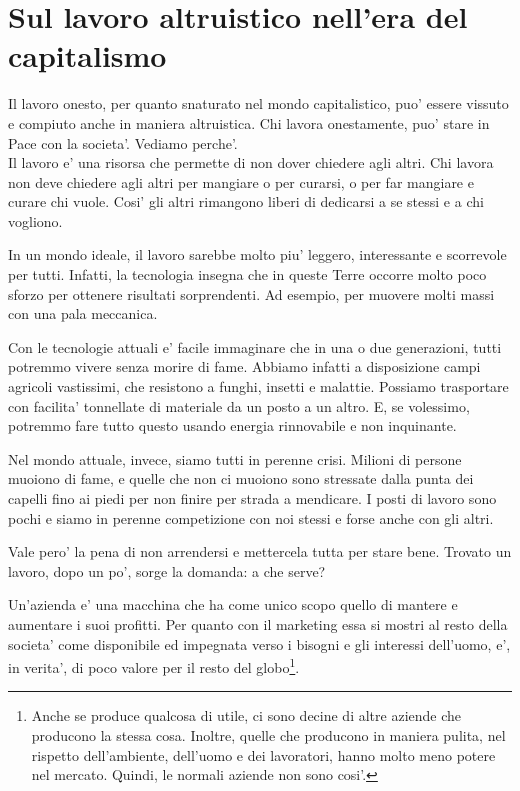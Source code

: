 \chapter{Sul lavoro altruistico nell'era del capitalismo}
\label{altruismoLavoro}

Il lavoro onesto, per quanto snaturato nel mondo capitalistico, puo' essere vissuto e compiuto anche in maniera altruistica. Chi lavora onestamente, puo' stare in Pace con la societa'. Vediamo perche'. \\

Il lavoro e' una risorsa che permette di non dover chiedere agli altri. Chi lavora non deve chiedere agli altri per mangiare o per curarsi, o per far mangiare e curare chi vuole.  Cosi' gli altri rimangono liberi di dedicarsi a se stessi e a chi vogliono. 

In un mondo ideale, il lavoro sarebbe molto piu' leggero, interessante e scorrevole per tutti. Infatti, la tecnologia insegna che in queste Terre occorre molto poco sforzo per ottenere risultati sorprendenti. Ad esempio, per muovere molti massi con una pala meccanica.

Con le tecnologie attuali e' facile immaginare che in una o due generazioni, tutti potremmo vivere senza morire di fame.
Abbiamo infatti a disposizione campi agricoli vastissimi, che resistono a funghi, insetti e malattie. Possiamo trasportare con facilita' tonnellate di materiale da un posto a un altro. E, se volessimo, potremmo fare tutto questo usando energia rinnovabile e non inquinante.

Nel mondo attuale, invece, siamo tutti in perenne crisi. Milioni di persone muoiono di fame, e quelle che non ci muoiono sono stressate dalla punta dei capelli fino ai piedi per non finire per strada a mendicare. I posti di lavoro sono pochi e siamo in perenne competizione con noi stessi e forse anche con gli altri.

Vale pero' la pena di non arrendersi e mettercela tutta per stare bene. Trovato un lavoro, dopo un po', sorge la domanda: a che serve?

Un'azienda e' una macchina che ha come unico scopo quello di mantere e aumentare i suoi profitti. Per quanto con il marketing essa si mostri al resto della societa' come disponibile ed impegnata verso i bisogni e gli interessi dell'uomo, e', in verita', di poco valore per il resto del globo\footnote{Anche se produce qualcosa di utile, ci sono decine di altre aziende che producono la stessa cosa. Inoltre, quelle che producono in maniera pulita, nel rispetto dell'ambiente, dell'uomo e dei lavoratori, hanno molto meno potere nel mercato. Quindi, le normali aziende non sono cosi'.}.

